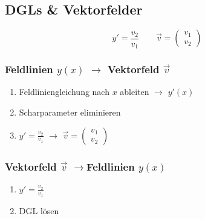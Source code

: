 \subsection{DGLs \& Vektorfelder}
    \vspace{0.5em}
    $$
    y' = \frac{v_2}{v_1} \qquad \vec{v} = \begin{pmatrix} v_1\\v_2 \end{pmatrix}
    $$
    \subsubsection{Feldlinien $y(x)$ $\to$ Vektorfeld $\vec{v}$}
        \begin{enumerate}
            \item Feldliniengleichung nach $x$ ableiten $\to$ $y'(x)$
            \item Scharparameter eliminieren
            \item $\displaystyle y' = \frac{v_2}{v_1}$ $\to$ $\vec{v} = \begin{pmatrix} v_1\\v_2 \end{pmatrix}$
        \end{enumerate}
    \subsubsection{Vektorfeld $\vec{v}$ $\to$Feldlinien $y(x)$}
        \vspace{0.5em}
        \begin{enumerate}
            \item $\displaystyle y' = \frac{v_2}{v_1}$
            \item DGL lösen
        \end{enumerate}